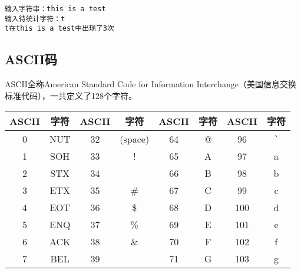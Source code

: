 \begin{tcolorbox}
	\begin{verbatim}
输入字符串：this is a test
输入待统计字符：t
t在this is a test中出现了3次
	\end{verbatim}
\end{tcolorbox}

\vspace{0.5cm}

\subsection{ASCII码}

ASCII全称American Standard Code for Information Interchange（美国信息交换标准代码），一共定义了128个字符。

\begin{longtable}{|c|c|c|c|c|c|c|c|}
	\hline
	\textbf{ASCII} & \textbf{字符} & \textbf{ASCII} & \textbf{字符} & \textbf{ASCII} & \textbf{字符}          & \textbf{ASCII} & \textbf{字符}          \\
	\hline
	0              & NUT           & 32             & (space)       & 64             & @                      & 96             & \lstinline|`| \\
	\hline
	1              & SOH           & 33             & !             & 65             & A                      & 97             & a                      \\
	\hline
	2              & STX           & 34             & \text{"}      & 66             & B                      & 98             & b                      \\
	\hline
	3              & ETX           & 35             & \#            & 67             & C                      & 99             & c                      \\
	\hline
	4              & EOT           & 36             & \$            & 68             & D                      & 100            & d                      \\
	\hline
	5              & ENQ           & 37             & \%            & 69             & E                      & 101            & e                      \\
	\hline
	6              & ACK           & 38             & \&            & 70             & F                      & 102            & f                      \\
	\hline
	7              & BEL           & 39             & \text{'}      & 71             & G                      & 103            & g                      \\

\end{longtable}
